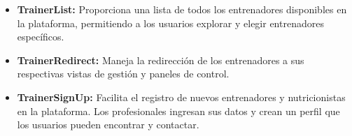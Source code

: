 \begin{itemize}
    \item \textbf{TrainerList:} Proporciona una lista de todos los entrenadores disponibles en la plataforma, permitiendo a los usuarios explorar y elegir entrenadores específicos.
    
    \item \textbf{TrainerRedirect:} Maneja la redirección de los entrenadores a sus respectivas vistas de gestión y paneles de control.
    
    \item \textbf{TrainerSignUp:} Facilita el registro de nuevos entrenadores y nutricionistas en la plataforma. Los profesionales ingresan sus datos y crean un perfil que los usuarios pueden encontrar y contactar.
\end{itemize}